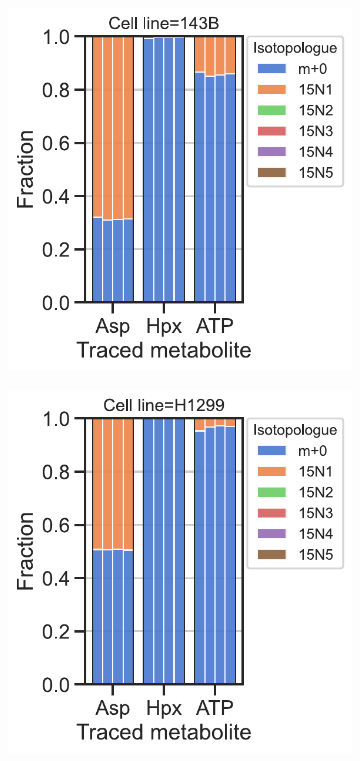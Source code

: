 \begin{figure}[ht]
     \centering
     \begin{subfigure}[b]{0.4\textwidth}
         \includegraphics[width=\textwidth]{figures/chap2/app/Ade-sal_143B.pdf}
         \caption{}
         \label{fig:app_ch2:ade_sal_143B}
     \end{subfigure}
     \hspace{0.015\textwidth}
     \begin{subfigure}[b]{0.4\textwidth}
         \includegraphics[width=\textwidth]{figures/chap2/app/Ade-sal_H1299.pdf}

\end{subfigure}
\end{figure}
